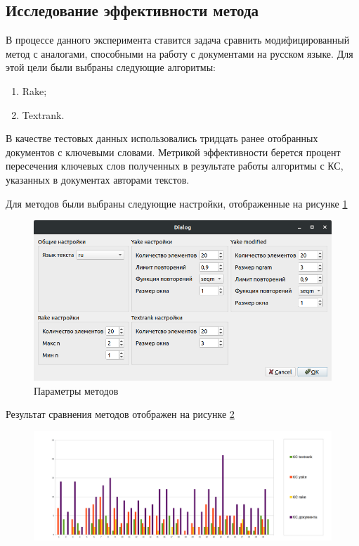 \subsection{Исследование эффективности метода}
В процессе данного эксперимента ставится задача сравнить модифицированный метод с аналогами, способными на работу с документами на русском языке.
Для этой цели были выбраны следующие алгоритмы:
\begin{enumerate}
	\item Rake;
	\item Textrank.
\end{enumerate}
В качестве тестовых данных использовались тридцать ранее отобранных документов с ключевыми словами.
Метрикой эффективности берется процент пересечения ключевых слов полученных в результате работы алгоритмы с КС, указанных в документах авторами текстов.

Для методов были выбраны следующие настройки, отображенные на рисунке \ref{fig:experiment31}
\begin{figure}[!h]
	\centering
	\includegraphics[width=1\linewidth]{src/img/experiment/experiment_3_1}
	\caption{Параметры методов}
	\label{fig:experiment31}
\end{figure}

Результат сравнения методов отображен на рисунке \ref{fig:experiment32}
\begin{figure}[!h]
	\centering
	\includegraphics[width=1\linewidth]{src/img/experiment/experiment_3_2}
	\caption{}
	\label{fig:experiment32}
\end{figure}

